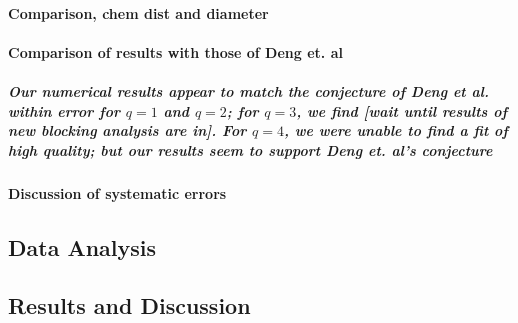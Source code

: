 \documentclass[pre,preprint]{revtex4-1}
\begin{document}
\paragraph{Comparison, chem dist and diameter}
\label{sec-1.4.1}
\paragraph{Comparison of results with those of Deng et. al}
\label{sec-1.4.2}
\subparagraph{Our numerical results appear to match the conjecture of Deng et al. \cite{Deng2010} within error for $q=1$ and $q=2$; for $q=3$, we find [wait until results of new blocking analysis are in].  For $q=4$, we were unable to find a fit of high quality; but our results seem to support Deng et. al's conjecture}
\label{sec-1.4.2.1}
\paragraph{Discussion of systematic errors}
\label{sec-1.4.3}
\subsection{Data Analysis}
\label{sec-1.3}
\subsection{Results and Discussion}
\label{sec-1.4}
\end{document}
